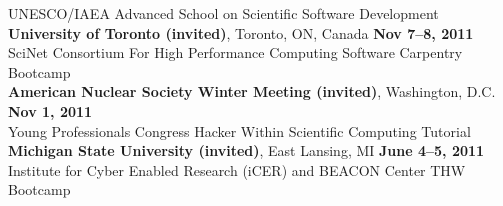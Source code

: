 \documentclass[margin,line]{resume}
\begin{document}
\begin{resume}
    UNESCO/IAEA Advanced School on Scientific Software Development
               \vspace{2mm}\\
    \textbf{University of Toronto (invited)}, Toronto, ON, Canada \hfill \textbf{Nov 7--8, 2011}\\
    SciNet Consortium For High Performance Computing Software Carpentry Bootcamp
               \vspace{2mm}\\
    \textbf{American Nuclear Society Winter Meeting (invited)}, Washington, D.C.  \hfill \textbf{Nov 1, 2011}\\
    Young Professionals Congress Hacker Within Scientific Computing Tutorial
               \vspace{2mm}\\
    \textbf{Michigan State University (invited)}, East Lansing, MI \hfill \textbf{June 4--5, 2011}\\
    Institute for Cyber Enabled Research (iCER) and BEACON Center THW Bootcamp


\end{resume}
\end{document}
